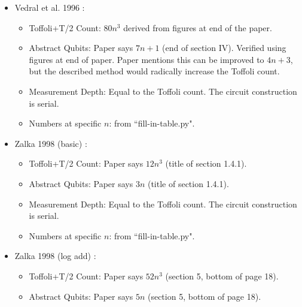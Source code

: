 \documentclass[a4paper, onecolumn, accepted=2021-03-29]{quantumarticle}
\begin{document}
\begin{itemize}
    \item Vedral et al. 1996 \cite{vedral1996arithmetic}:
    \begin{itemize}
        \item Toffoli+T/2 Count:
            $80n^3$ derived from figures at end of the paper.
        \item Abstract Qubits:
            Paper says $7n+1$ (end of section IV).
            Verified using figures at end of paper.
            Paper mentions this can be improved to $4n + 3$, but the described method would radically increase the Toffoli count.
        \item Measurement Depth:
            Equal to the Toffoli count.
            The circuit construction is serial.
        \item Numbers at specific $n$: from ``fill-in-table.py".
    \end{itemize}
    \item Zalka 1998 (basic) \cite{zalka1998fast}:
    \begin{itemize}
        \item Toffoli+T/2 Count:
            Paper says $12n^3$ (title of section 1.4.1).
        \item Abstract Qubits:
            Paper says $3n$ (title of section 1.4.1).
        \item Measurement Depth:
            Equal to the Toffoli count.
            The circuit construction is serial.
        \item Numbers at specific $n$: from ``fill-in-table.py".
    \end{itemize}
    \item Zalka 1998 (log add) \cite{zalka1998fast}:
    \begin{itemize}
        \item Toffoli+T/2 Count:
            Paper says $52n^3$ (section 5, bottom of page 18).
        \item Abstract Qubits:
            Paper says $5n$ (section 5, bottom of page 18).

\end{itemize}
\end{itemize}
\end{document}
